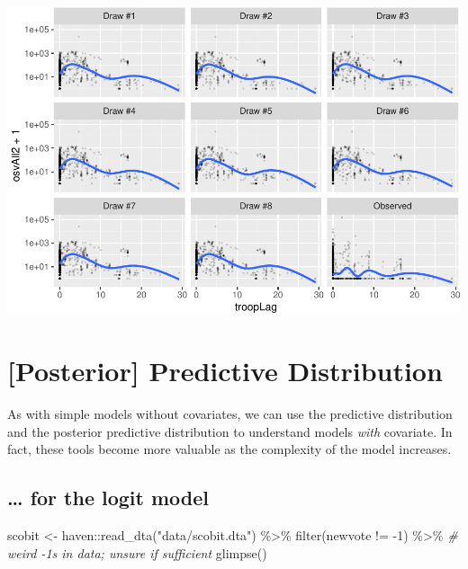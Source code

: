 \documentclass[
]{book}
\newenvironment{Shaded}{\begin{snugshade}}{\end{snugshade}}
\newcommand{\CommentTok}[1]{\textcolor[rgb]{0.56,0.35,0.01}{\textit{#1}}}
\newcommand{\DecValTok}[1]{\textcolor[rgb]{0.00,0.00,0.81}{#1}}
\newcommand{\FunctionTok}[1]{\textcolor[rgb]{0.00,0.00,0.00}{#1}}
\newcommand{\NormalTok}[1]{#1}
\newcommand{\OtherTok}[1]{\textcolor[rgb]{0.56,0.35,0.01}{#1}}
\newcommand{\SpecialCharTok}[1]{\textcolor[rgb]{0.00,0.00,0.00}{#1}}
\newcommand{\StringTok}[1]{\textcolor[rgb]{0.31,0.60,0.02}{#1}}
\begin{document}
\includegraphics{03-03-poisson-model_files/figure-latex/unnamed-chunk-5-1.pdf}

\hypertarget{posterior-predictive-distribution-1}{%
\section{{[}Posterior{]} Predictive Distribution}\label{posterior-predictive-distribution-1}}

As with simple models without covariates, we can use the predictive distribution and the posterior predictive distribution to understand models \emph{with} covariate. In fact, these tools become more valuable as the complexity of the model increases.

\hypertarget{for-the-logit-model}{%
\subsection{\ldots{} for the logit model}\label{for-the-logit-model}}

\begin{Shaded}
\begin{Highlighting}[]
\NormalTok{scobit }\OtherTok{\textless{}{-}}\NormalTok{ haven}\SpecialCharTok{::}\FunctionTok{read\_dta}\NormalTok{(}\StringTok{"data/scobit.dta"}\NormalTok{) }\SpecialCharTok{\%\textgreater{}\%}
  \FunctionTok{filter}\NormalTok{(newvote }\SpecialCharTok{!=} \SpecialCharTok{{-}}\DecValTok{1}\NormalTok{) }\SpecialCharTok{\%\textgreater{}\%}  \CommentTok{\# weird {-}1s in data; unsure if sufficient}
  \FunctionTok{glimpse}\NormalTok{()}
\end{Highlighting}
\end{Shaded}
\end{document}
